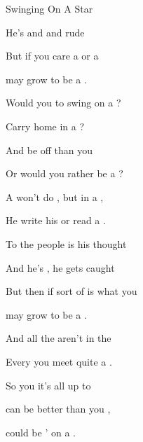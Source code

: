 \begin{SBSong}{Swinging On A Star}
\begin{SBVerse}
    He's  and  and  rude
    
    But if you  care a  or a  
    
     may grow  to be a .
  \end{SBVerse}
  \CBPageBrk
  \begin{SBChorus}
    Would you  to swing on a ?
    
    Carry  home in a ?
    
    And be  off than you 
    
    Or would you rather be a ?
  \end{SBChorus}
  \begin{SBVerse}
    A  won't do , but  in a ,
    
    He  write his  or read a .
    
    To  the people is his  thought
    
    And  he's , he  gets caught
    
    But then if  sort of  is what you  
    
     may grow  to be a .
  \end{SBVerse}
  
  \begin{SBVerse}
    And all the  aren't in the 
    
    Every  you meet quite a .
    
    So you  it's all up to 
    
     can be better than you ,     
    
     could be ' on a .
  \end{SBVerse}
\end{SBSong}
